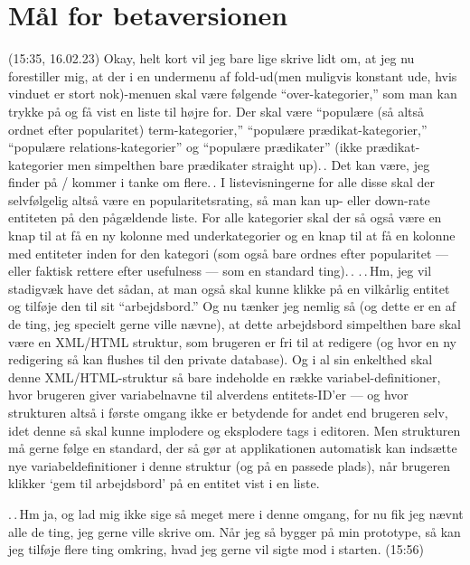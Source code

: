 \documentclass{report}
\begin{document}
\section{Mål for betaversionen}

(15:35, 16.02.23) Okay, helt kort vil jeg bare lige skrive lidt om, at jeg nu forestiller mig, at der i en undermenu af fold-ud(men muligvis konstant ude, hvis vinduet er stort nok)-menuen skal være følgende ``over-kategorier,'' som man kan trykke på og få vist en liste til højre for. Der skal være ``populære (så altså ordnet efter popularitet) term-kategorier,'' ``populære prædikat-kategorier,'' ``populære relations-kategorier'' og ``populære prædikater'' (ikke prædikat-kategorier men simpelthen bare prædikater straight up).\,. Det kan være, jeg finder på / kommer i tanke om flere.\,. I listevisningerne for alle disse skal der selvfølgelig altså være en popularitetsrating, så man kan up- eller down-rate entiteten på den pågældende liste. For alle kategorier skal der så også være en knap til at få en ny kolonne med underkategorier og en knap til at få en kolonne med entiteter inden for den kategori (som også bare ordnes efter popularitet --- eller faktisk rettere efter usefulness --- som en standard ting).\,. .\,.\,Hm, jeg vil stadigvæk have det sådan, at man også skal kunne klikke på en vilkårlig entitet og tilføje den til sit ``arbejdsbord.'' Og nu tænker jeg nemlig så (og dette er en af de ting, jeg specielt gerne ville nævne), at dette arbejdsbord simpelthen bare skal være en XML/HTML struktur, som brugeren er fri til at redigere (og hvor en ny redigering så kan flushes til den private database). Og i al sin enkelthed skal denne XML/HTML-struktur så bare indeholde en række variabel-definitioner, hvor brugeren giver variabelnavne til alverdens entitets-ID'er --- og hvor strukturen altså i første omgang ikke er betydende for andet end brugeren selv, idet denne så skal kunne implodere og eksplodere tags i editoren. Men strukturen må gerne følge en standard, der så gør at applikationen automatisk kan indsætte nye variabeldefinitioner i denne struktur (og på en passede plads), når brugeren klikker `gem til arbejdsbord' på en entitet vist i en liste. 

.\,.\,Hm ja, og lad mig ikke sige så meget mere i denne omgang, for nu fik jeg nævnt alle de ting, jeg gerne ville skrive om. Når jeg så bygger på min prototype, så kan jeg tilføje flere ting omkring, hvad jeg gerne vil sigte mod i starten. (15:56)
\end{document}
